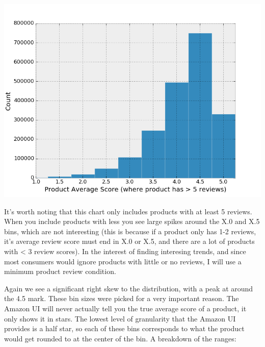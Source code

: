 \documentclass[a4paper,10pt]{article}
\begin{document}
\begin{center}
    \includegraphics[scale=0.65]{starbins_gt_5.png}
\end{center}

It's worth noting that this chart only includes products with at least 5 reviews. When you include products with less you see large spikes around the X.0 and X.5 bins, which are not interesting (this is because if a product only has 1-2 reviews, it's average review score must end in X.0 or X.5, and there are a lot of products with < 3 review scores). In the interest of finding interesing trends, and since most consumers would ignore products with little or no reviews, I will use a minimum product review condition.

Again we see a significant right skew to the distribution, with a peak at around the 4.5 mark. These bin sizes were picked for a very important reason. The Amazon UI will never actually tell you the true average score of a product, it only shows it in stars. The lowest level of granularity that the Amazon UI provides is a half star, so each of these bins corresponds to what the product would get rounded to at the center of the bin. A breakdown of the ranges:
\end{document}
